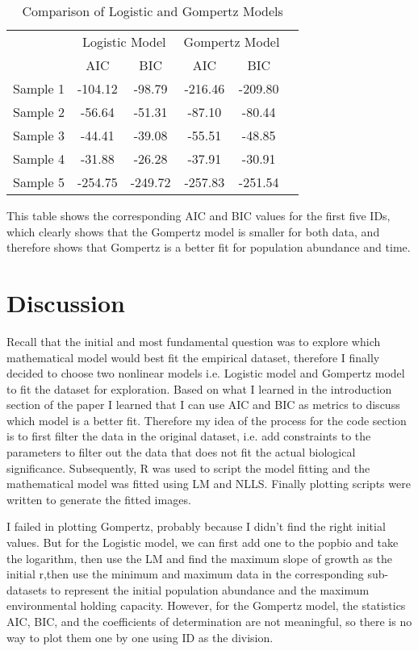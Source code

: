 \documentclass[11pt]{article}
\begin{document}
\begin{table}[htbp]
  \centering
  \caption{Comparison of Logistic and Gompertz Models}
  \begin{tabular}{cccccc}
    \toprule
    & \multicolumn{2}{c}{Logistic Model} & \multicolumn{2}{c}{Gompertz Model} \\
    \cmidrule(lr){2-3} \cmidrule(lr){4-5}
    & AIC & BIC & AIC & BIC \\
    \midrule
    Sample 1 & -104.12 & -98.79 & -216.46 & -209.80 \\
    Sample 2 & -56.64 & -51.31 & -87.10 & -80.44 \\
    Sample 3 & -44.41 & -39.08 & -55.51 & -48.85 \\
    Sample 4 & -31.88 & -26.28 & -37.91 & -30.91 \\
    Sample 5 & -254.75 & -249.72 & -257.83 & -251.54 \\
    \bottomrule
  \end{tabular}
\end{table}
This table shows the corresponding AIC and BIC values for the first five IDs, which clearly shows that the Gompertz model is smaller for both data, and therefore shows that Gompertz is a better fit for population abundance and time.
\section{Discussion}
Recall that the initial and most fundamental question was to explore which mathematical model would best fit the empirical dataset, therefore I finally decided to choose two nonlinear models i.e. Logistic model and Gompertz model to fit the dataset for exploration. Based on what I learned in the introduction section of the paper I learned that I can use AIC and BIC as metrics to discuss which model is a better fit. Therefore my idea of the process for the code section is to first filter the data in the original dataset, i.e. add constraints to the parameters to filter out the data that does not fit the actual biological significance. Subsequently, R was used to script the model fitting and the mathematical model was fitted using LM and NLLS. Finally plotting scripts were written to generate the fitted images.

I failed in plotting Gompertz, probably because I didn't find the right initial values. But for the Logistic model, we can first add one to the popbio and take the logarithm, then use the LM and find the maximum slope of growth as the initial r,then use the minimum and maximum data in the corresponding sub-datasets to represent the initial population abundance and the maximum environmental holding capacity. However, for the Gompertz model, the statistics AIC, BIC, and the coefficients of determination are not meaningful, so there is no way to plot them one by one using ID as the division.
\end{document}

